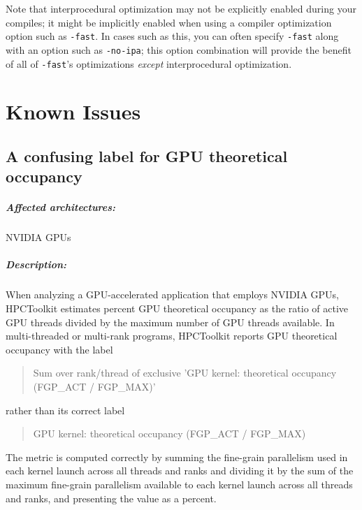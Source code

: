 \documentclass[11pt,letterpaper]{report}
\begin{document}
Note that interprocedural optimization may not be explicitly enabled during your compiles; it might be implicitly enabled when using a compiler optimization option such as \texttt{-fast}.
In cases such as this, you can often specify \texttt{-fast} along with an option such as \texttt{-no-ipa}; this option combination will provide the benefit of all of \texttt{-fast}'s optimizations {\em except} interprocedural optimization.


\chapter{Known Issues}
\label{chpt:known}

\section{A confusing label for GPU theoretical occupancy}

\paragraph{Affected architectures:}  NVIDIA GPUs

\paragraph{Description:} When analyzing a GPU-accelerated application that employs NVIDIA GPUs, HPCToolkit estimates percent GPU theoretical occupancy as the ratio of active GPU threads divided by the maximum number of GPU threads available. In multi-threaded or multi-rank programs, HPCToolkit reports GPU  theoretical occupancy with the label 

\begin{quote}
Sum over rank/thread of exclusive 'GPU kernel: theoretical occupancy (FGP\_ACT / FGP\_MAX)'
\end{quote}

\noindent rather than its correct label

\begin{quote}
GPU kernel: theoretical occupancy (FGP\_ACT / FGP\_MAX)
\end{quote}

The metric is computed correctly by summing the fine-grain parallelism used in each kernel launch across all threads and ranks and dividing it by the sum of the maximum fine-grain parallelism available to each kernel launch across all threads and ranks, and presenting the value as a percent.
\end{document}
